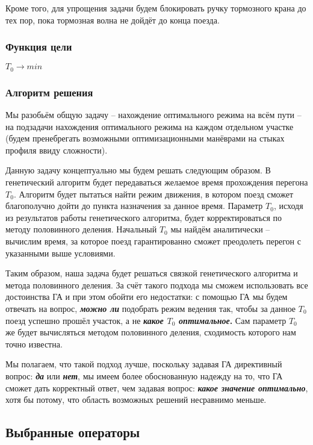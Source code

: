 Кроме того, для упрощения задачи будем блокировать ручку тормозного крана до тех пор, пока тормозная волна не дойдёт до конца поезда.


\subsubsection{Функция цели}
$T_{0}\rightarrow min$

\subsubsection{Алгоритм решения}

Мы разобьём общую задачу -- нахождение оптимального режима на всём пути -- на подзадачи нахождения оптимального режима на каждом отдельном участке (будем пренебрегать возможными оптимизационными манёврами на стыках профиля ввиду сложности).

Данную задачу концептуально мы будем решать следующим образом.
В генетический алгоритм будет передаваться желаемое время прохождения перегона $T_0$. Алгоритм будет пытаться найти режим движения, в котором поезд сможет благополучно дойти до пункта назначения за данное время. Параметр $T_0$, исходя из результатов работы генетического алгоритма, будет корректироваться по методу половинного деления. Начальный $T_0$ мы найдём аналитически -- вычислим время, за которое поезд гарантированно сможет преодолеть перегон с указанными выше условиями.

Таким образом, наша задача будет решаться связкой генетического алгоритма и метода половинного деления. За счёт такого подхода мы сможем использовать все достоинства ГА и при этом обойти его недостатки: с помощью ГА мы будем отвечать на вопрос, \textbf{\textit{можно ли}} подобрать режим ведения так, чтобы за данное $T_0$ поезд успешно прошёл участок, а не \textbf{\textit{какое $T_0$ оптимальное}.} Сам параметр $T_0$ же будет вычисляться методом половинного деления, сходимость которого нам точно известна.

Мы полагаем, что такой подход лучше, поскольку задавая ГА директивный вопрос: \textbf{\textit{да}} или \textbf{\textit{нет}}, мы имеем более обоснованную надежду на то, что ГА сможет дать корректный ответ, чем задавая вопрос: \textbf{\textit{какое значение оптимально}}, хотя бы потому, что область возможных решений несравнимо меньше. 

\subsection{Выбранные операторы}

